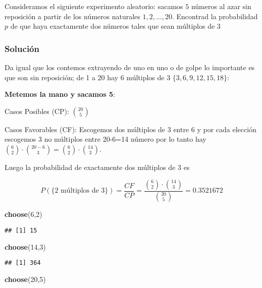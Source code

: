 \documentclass[
]{article}
\newenvironment{Shaded}{\begin{snugshade}}{\end{snugshade}}
\newcommand{\DecValTok}[1]{\textcolor[rgb]{0.00,0.00,0.81}{#1}}
\newcommand{\KeywordTok}[1]{\textcolor[rgb]{0.13,0.29,0.53}{\textbf{#1}}}
\newcommand{\NormalTok}[1]{#1}
\begin{document}
Consideramos el siguiente experimento aleatorio: sacamos \(5\) números
al azar sin reposición a partir de los números naturales
\(1,2,\dots,20\). Encontrad la probabilidad \(p\) de que haya
exactamente dos números tales que sean múltiplos de \(3\)

\hypertarget{soluciuxf3n-13}{%
\subsubsection{Solución}\label{soluciuxf3n-13}}

Da igual que los contemos extrayendo de uno en uno o de golpe lo
importante es que son sin reposición; de 1 a 20 hay 6 múltiplos de 3
\(\{3,6,9,12,15,18\}\):

\textbf{Metemos la mano y sacamos 5}:

Casos Posibles (CP): \({20 \choose 5}\)

Casos Favorables (CF): Escogemos dos múltiplos de 3 entre 6 y por cada
elección escogemos 3 no múltiplos entre 20-6=14 número por lo tanto hay
\({6 \choose 2}\cdot{{20-6} \choose 3}={6 \choose 2}\cdot{{14} \choose 3}\).

Luego la probabilidad de exactamente dos múltiplos de 3 es

\[
P(\mbox{\{2 múltiplos de 3\}} )=\frac{CF}{CP}=\frac{{6 \choose 2}\cdot{14 \choose 3}}{{20 \choose 5}}=0.3521672
\]

\begin{Shaded}
\begin{Highlighting}[]
\KeywordTok{choose}\NormalTok{(}\DecValTok{6}\NormalTok{,}\DecValTok{2}\NormalTok{)}
\end{Highlighting}
\end{Shaded}

\begin{verbatim}
## [1] 15
\end{verbatim}

\begin{Shaded}
\begin{Highlighting}[]
\KeywordTok{choose}\NormalTok{(}\DecValTok{14}\NormalTok{,}\DecValTok{3}\NormalTok{)}
\end{Highlighting}
\end{Shaded}

\begin{verbatim}
## [1] 364
\end{verbatim}

\begin{Shaded}
\begin{Highlighting}[]
\KeywordTok{choose}\NormalTok{(}\DecValTok{20}\NormalTok{,}\DecValTok{5}\NormalTok{)}
\end{Highlighting}
\end{Shaded}
\end{document}
